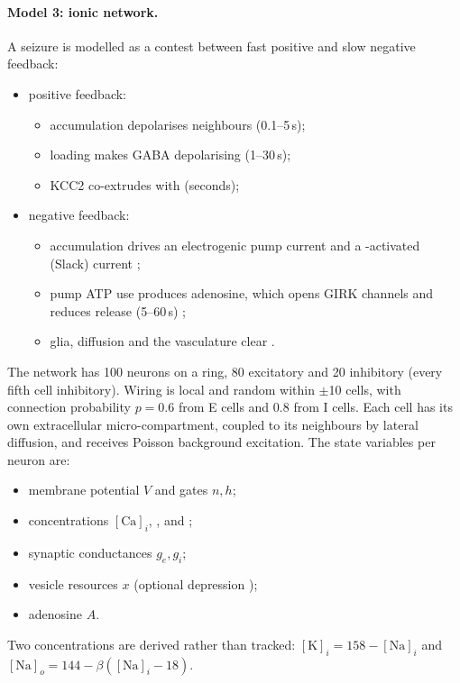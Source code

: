 \paragraph{Model 3: ionic network.} A seizure is modelled as a contest between fast positive and slow negative feedback:
\begin{itemize}
\item positive feedback:
\begin{itemize}
\item \Kp{} accumulation depolarises neighbours (0.1--5\,s);
\item \Clm{} loading makes GABA depolarising (1--30\,s);
\item KCC2 co-extrudes \Kp{} with \Clm{} (seconds);
\end{itemize}
\item negative feedback:
\begin{itemize}
\item \Nap{} accumulation drives an electrogenic pump current and a \Nap-activated \Kp{} (Slack) current \cite{krishnan2011,compte2003};
\item pump ATP use produces adenosine, which opens GIRK channels and reduces release (5--60\,s) \cite{during1992};
\item glia, diffusion and the vasculature clear \Kp.
\end{itemize}
\end{itemize}

The network has 100 neurons on a ring, 80 excitatory and 20 inhibitory (every fifth cell inhibitory). Wiring is local and random within $\pm$10 cells, with connection probability $p=0.6$ from E cells and $0.8$ from I cells. Each cell has its own extracellular micro-compartment, coupled to its neighbours by lateral \Kp{} diffusion, and receives Poisson background excitation. The state variables per neuron are:
\begin{itemize}
\item membrane potential $V$ and gates $n,h$;
\item concentrations $[\mathrm{Ca}]_i$, \Ko, \Nai{} and \Cli;
\item synaptic conductances $g_e,g_i$;
\item vesicle resources $x$ (optional depression \cite{tsodyks1997});
\item adenosine $A$.
\end{itemize}
Two concentrations are derived rather than tracked: $[\mathrm{K}]_i = 158-[\mathrm{Na}]_i$ and $[\mathrm{Na}]_o = 144-\beta([\mathrm{Na}]_i-18)$.

